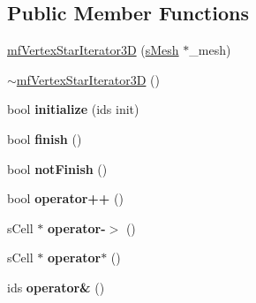 \subsection*{Public Member Functions}
\begin{DoxyCompactItemize}
\item 
\hyperlink{classmf_1_1mfVertexStarIterator3D_a0602e37cf9ad3c3ec4d72684c2594c77}{mfVertexStarIterator3D} (\hyperlink{classmf_1_1mfIterator_aca31e4d7e7eca4e3b100530d8725064b}{sMesh} $\ast$\_\-mesh)
\item 
\hyperlink{classmf_1_1mfVertexStarIterator3D_a6fc44da5b33a391c7abd7e29dcd37d5c}{$\sim$mfVertexStarIterator3D} ()
\item 
\hypertarget{classmf_1_1mfVertexStarIterator3D_ad1bb694599a8648098b8d3e4e48f788c}{
bool {\bfseries initialize} (ids init)}
\label{classmf_1_1mfVertexStarIterator3D_ad1bb694599a8648098b8d3e4e48f788c}

\item 
\hypertarget{classmf_1_1mfVertexStarIterator3D_ad624324340f0d703ad758605bd4e8a78}{
bool {\bfseries finish} ()}
\label{classmf_1_1mfVertexStarIterator3D_ad624324340f0d703ad758605bd4e8a78}

\item 
\hypertarget{classmf_1_1mfVertexStarIterator3D_a929ffee847a4f36301154b8c741e9378}{
bool {\bfseries notFinish} ()}
\label{classmf_1_1mfVertexStarIterator3D_a929ffee847a4f36301154b8c741e9378}

\item 
\hypertarget{classmf_1_1mfVertexStarIterator3D_aa9757da8b9281d43f90f7d0643f3bf86}{
bool {\bfseries operator++} ()}
\label{classmf_1_1mfVertexStarIterator3D_aa9757da8b9281d43f90f7d0643f3bf86}

\item 
\hypertarget{classmf_1_1mfVertexStarIterator3D_afe865fa2a605861aa925c7aba56281a2}{
sCell $\ast$ {\bfseries operator-\/$>$} ()}
\label{classmf_1_1mfVertexStarIterator3D_afe865fa2a605861aa925c7aba56281a2}

\item 
\hypertarget{classmf_1_1mfVertexStarIterator3D_ae940b9144e4d09c80fba7778145a2bf2}{
sCell $\ast$ {\bfseries operator$\ast$} ()}
\label{classmf_1_1mfVertexStarIterator3D_ae940b9144e4d09c80fba7778145a2bf2}

\item 
\hypertarget{classmf_1_1mfVertexStarIterator3D_a9efd39ba01d0d9544b97ec97ad7b4a69}{
ids {\bfseries operator\&} ()}
\label{classmf_1_1mfVertexStarIterator3D_a9efd39ba01d0d9544b97ec97ad7b4a69}

\end{DoxyCompactItemize}
